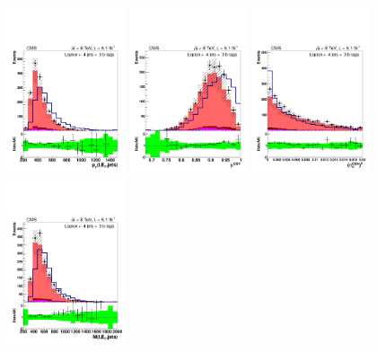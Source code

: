 \begin{figure}[hbtp]
 \begin{center}
   \includegraphics[width=0.31\textwidth]{Figures/Analysis_1_Diagrams/d2MCPlots_all_sum_pt_incl_met_cut4_j4_t3_Combined_HtWgt.pdf}
   \includegraphics[width=0.31\textwidth]{Figures/Analysis_1_Diagrams/d2MCPlots_avg_btag_disc_btags_cut4_j4_t3_Combined_HtWgt.pdf}
   \includegraphics[width=0.31\textwidth]{Figures/Analysis_1_Diagrams/d2MCPlots_dev_from_avg_disc_btags_cut4_j4_t3_Combined_HtWgt.pdf}
   \includegraphics[width=0.31\textwidth]{Figures/Analysis_1_Diagrams/d2MCPlots_dijet_mass_of_everything_cut4_j4_t3_Combined_HtWgt.pdf}

\end{center}
\end{figure}
